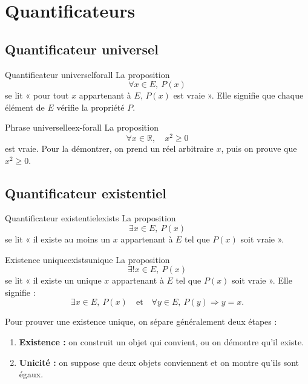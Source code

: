 \documentclass[11pt,a4paper]{article}
\newcommand{\R}{\mathbb{R}}
\begin{document}
\section{Quantificateurs}

\subsection{Quantificateur universel}

\begin{definitionbox}{Quantificateur universel}{forall}
La proposition
\[
\forall x\in E,\ P(x)
\]
se lit « pour tout $x$ appartenant à $E$, $P(x)$ est vraie ». Elle signifie que chaque élément de $E$ vérifie la propriété $P$.
\end{definitionbox}

\begin{exemplebox}{Phrase universelle}{ex-forall}
La proposition
\[
\forall x\in\R,\quad x^2\geq 0
\]
est vraie. Pour la démontrer, on prend un réel arbitraire $x$, puis on prouve que $x^2\geq 0$.
\end{exemplebox}

\subsection{Quantificateur existentiel}

\begin{definitionbox}{Quantificateur existentiel}{exists}
La proposition
\[
\exists x\in E,\ P(x)
\]
se lit « il existe au moins un $x$ appartenant à $E$ tel que $P(x)$ soit vraie ».
\end{definitionbox}

\begin{definitionbox}{Existence unique}{existsunique}
La proposition
\[
\exists ! x\in E,\ P(x)
\]
se lit « il existe un unique $x$ appartenant à $E$ tel que $P(x)$ soit vraie ». Elle signifie :
\[
\exists x\in E,\ P(x)
\quad\text{et}\quad
\forall y\in E,\ P(y)\Rightarrow y=x.
\]
\end{definitionbox}

\begin{methodebox}
Pour prouver une existence unique, on sépare généralement deux étapes :
\begin{enumerate}
  \item \textbf{Existence :} on construit un objet qui convient, ou on démontre qu'il existe.
  \item \textbf{Unicité :} on suppose que deux objets conviennent et on montre qu'ils sont égaux.
\end{enumerate}
\end{methodebox}
\end{document}
